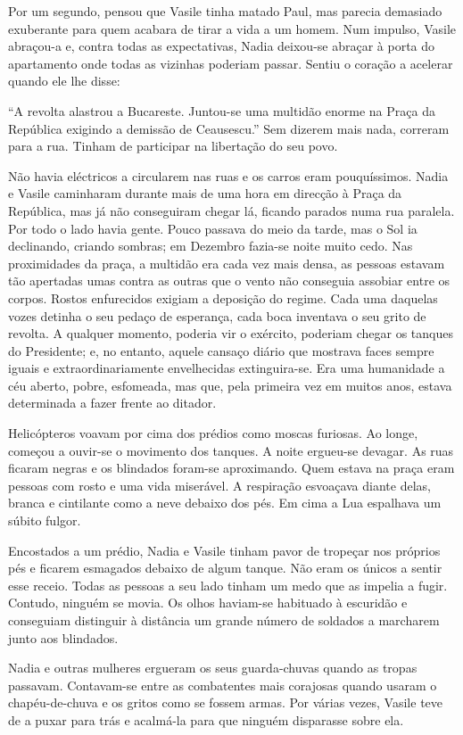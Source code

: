 Por um segundo, pensou que Vasile tinha matado Paul, mas parecia
demasiado exuberante para quem acabara de tirar a vida a um homem. Num
impulso, Vasile abraçou-a e, contra todas as expectativas, Nadia
deixou-se abraçar à porta do apartamento onde todas as vizinhas poderiam
passar. Sentiu o coração a acelerar quando ele lhe disse:

``A revolta alastrou a Bucareste. Juntou-se uma multidão enorme na Praça
da República exigindo a demissão de
Ceausescu.'' Sem dizerem mais nada, correram para a rua. Tinham de
participar na libertação do seu povo.

Não havia eléctricos a circularem nas ruas e os carros eram
pouquíssimos. Nadia e Vasile caminharam durante mais de uma hora em
direcção à Praça da República, mas já não conseguiram chegar lá, ficando
parados numa rua paralela. Por todo o lado havia gente. Pouco passava do
meio da tarde, mas o Sol ia declinando, criando sombras; em Dezembro
fazia-se noite muito cedo. Nas proximidades da praça, a multidão era
cada vez mais densa, as pessoas estavam tão apertadas umas contra as
outras que o vento não conseguia assobiar entre os corpos. Rostos
enfurecidos exigiam a deposição do regime. Cada uma daquelas vozes
detinha o seu pedaço de esperança, cada boca inventava o seu grito de
revolta. A qualquer momento, poderia vir o exército, poderiam chegar
os tanques do Presidente; e, no entanto, aquele cansaço diário que
mostrava faces sempre iguais e extraordinariamente envelhecidas
extinguira-se. Era uma humanidade a céu aberto, pobre, esfomeada, mas
que, pela primeira vez em muitos anos, estava determinada a fazer frente
ao ditador.

Helicópteros voavam por cima dos prédios como moscas furiosas. Ao longe, começou a ouvir-se o movimento dos tanques. A
noite ergueu-se devagar. As ruas ficaram negras e os blindados foram-se
aproximando. Quem estava na praça eram pessoas com rosto e uma vida
miserável. A respiração esvoaçava diante delas, branca e cintilante como
a neve debaixo dos pés. Em cima a Lua espalhava um súbito fulgor.


Encostados a um prédio, Nadia e Vasile tinham pavor de tropeçar nos
próprios pés e ficarem esmagados debaixo de algum tanque. Não eram os
únicos a sentir esse receio. Todas as pessoas a seu lado tinham um medo
que as impelia a fugir. Contudo, ninguém se movia. Os olhos haviam-se
habituado à escuridão e conseguiam distinguir à distância um grande
número de soldados a marcharem junto aos blindados.

Nadia e outras mulheres ergueram os seus guarda-chuvas quando as tropas passavam. Contavam-se entre as combatentes mais
corajosas quando usaram o chapéu-de-chuva e os gritos como se fossem armas. Por várias vezes, Vasile teve
de a puxar para trás e acalmá-la para que ninguém disparasse sobre
ela.

